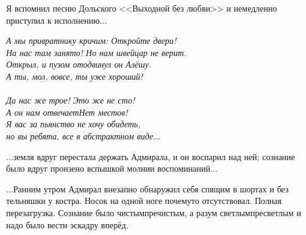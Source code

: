 Я вспомнил песню Дольского <<Выходной без любви>> и немедленно приступил к исполнению$\ldots$  

\vspace{0.5cm}
\noindent\textit{А мы привратнику кричим: Откройте двери! \\
На нас там занято! Но нам швейцар не верит. \\
Открыл, и пузом отодвинул он Алёшу. \\
\diagdash А ты, мол, вовсе, ты уже хороший!\\
\\
\diagdash Да нас же трое! Это же не сто!\\
А он нам отвечает\mdash Нет местов!\\
Я вас за пьянство не хочу обидеть,\\
но вы ребята, все в абстрактном виде$\ldots$ 
}
\vspace{0.5cm}

$\ldots$земля вдруг перестала держать Адмирала, и он воспарил над ней; сознание было вдруг пронзено вспышкой молнии воспоминаний$\ldots$






\begin{center}
\end{center}

$\ldots$Ранним утром Адмирал внезапно обнаружил себя спящим в шортах и без тельняшки у костра. Носок на одной ноге почему\sdash то отсутствовал. Полная перезагрузка. Сознание было чистым\sdash пречистым, а разум светлым\sdash пресветлым и надо было вести эскадру вперёд.

\begin{center}
\end{center}
